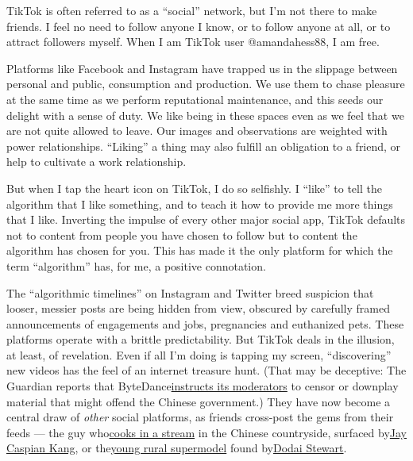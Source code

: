 TikTok is often referred to as a ``social'' network, but I'm not there
to make friends. I feel no need to follow anyone I know, or to follow
anyone at all, or to attract followers myself. When I am TikTok user
@amandahess88, I am free.

Platforms like Facebook and Instagram have trapped us in the slippage
between personal and public, consumption and production. We use them to
chase pleasure at the same time as we perform reputational maintenance,
and this seeds our delight with a sense of duty. We like being in these
spaces even as we feel that we are not quite allowed to leave. Our
images and observations are weighted with power relationships.
``Liking'' a thing may also fulfill an obligation to a friend, or help
to cultivate a work relationship.

But when I tap the heart icon on TikTok, I do so selfishly. I ``like''
to tell the algorithm that I like something, and to teach it how to
provide me more things that I like. Inverting the impulse of every other
major social app, TikTok defaults not to content from people you have
chosen to follow but to content the algorithm has chosen for you. This
has made it the only platform for which the term ``algorithm'' has, for
me, a positive connotation.

The ``algorithmic timelines'' on Instagram and Twitter breed suspicion
that looser, messier posts are being hidden from view, obscured by
carefully framed announcements of engagements and jobs, pregnancies and
euthanized pets. These platforms operate with a brittle predictability.
But TikTok deals in the illusion, at least, of revelation. Even if all
I'm doing is tapping my screen, ``discovering'' new videos has the feel
of an internet treasure hunt. (That may be deceptive: The Guardian
reports that
ByteDance\href{https://www.theguardian.com/technology/2019/sep/25/revealed-how-tiktok-censors-videos-that-do-not-please-beijing}{}\href{https://www.theguardian.com/technology/2019/sep/25/revealed-how-tiktok-censors-videos-that-do-not-please-beijing}{instructs
its moderators} to censor or downplay material that might offend the
Chinese government.) They have now become a central draw of \emph{other}
social platforms, as friends cross-post the gems from their feeds ---
the guy
who\href{http://vm.tiktok.com/fVUQAG/}{}\href{http://vm.tiktok.com/fVUQAG/}{cooks
in a stream} in the Chinese countryside, surfaced
by\href{https://twitter.com/jaycaspiankang}{}\href{https://twitter.com/jaycaspiankang}{Jay
Caspian Kang}, or
the\href{http://vm.tiktok.com/fVHnMK/}{}\href{http://vm.tiktok.com/fVHnMK/}{young
rural supermodel} found
by\href{https://twitter.com/dodaistewart}{}\href{https://twitter.com/dodaistewart}{Dodai
Stewart}.

